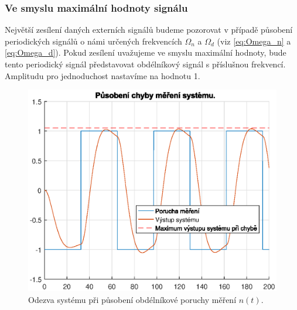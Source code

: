 \documentclass[a4paper,11pt]{article}
\begin{document}
\subsubsection{Ve smyslu maximální hodnoty signálu}
Největší zesílení daných externích signálů budeme pozorovat v případě působení periodických signálů o námi určených frekvencích $ \Omega _{n} $ a $ \Omega _{d}$ (viz \ref{eq:Omega_n} a \ref{eq:Omega_d}). Pokud zesílení uvažujeme ve smyslu maximální hodnoty, bude tento periodický signál představovat obdélníkový signál s příslušnou frekvencí. Amplitudu pro jednoduchost nastavíme na hodnotu 1.
\begin{figure}[htbp]
	\begin{center}
	\includegraphics[scale = 1.0]{obrazky/nT2.eps}
	\caption{Odezva systému při působení obdélníkové poruchy měření $ n\left ( t \right ) $.}
	\label{fig:4_maxval-n}
	\end{center}
\end{figure}
\end{document}
